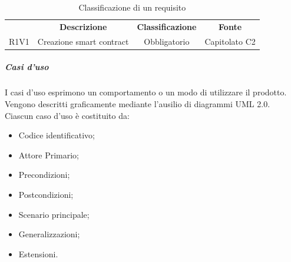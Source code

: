             \begin{table}[H]
              \centering
              \renewcommand{\arraystretch}{1.8}
              \begin{tabular}{cccc}
                \rowcolor[HTML]{125E28} 
                \multicolumn{1}{c}{\color[HTML]{FFFFFF}\textbf{Requisito}} 
                & \color[HTML]{FFFFFF}\textbf{Descrizione} 
                & \color[HTML]{FFFFFF}\textbf{Classificazione} 
                & \color[HTML]{FFFFFF}\textbf{Fonte}\\
            
                R1V1  &  Creazione smart contract  &  Obbligatorio  &  Capitolato C2\\    
            
              \end{tabular}
              \caption{Classificazione di un requisito}
            \end{table}
                        
            \subparagraph{Casi d'uso} \label{subparagraph:Casi d'uso}
            I casi d'uso esprimono un comportamento o un modo di utilizzare il prodotto.\\
            Vengono descritti graficamente mediante l'ausilio di diagrammi UML 2.0.\\
            Ciascun caso d'uso è costituito da:
            \begin{itemize}
                \item Codice identificativo;
                \item Attore Primario;
                \item Precondizioni;
                \item Postcondizioni;
                \item Scenario principale;
                \item Generalizzazioni;
                \item Estensioni.
            \end{itemize}

